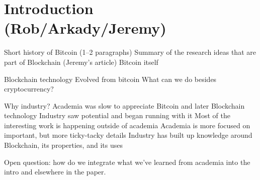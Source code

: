 
\section{Introduction (Rob/Arkady/Jeremy)}
Short history of Bitcoin (1--2 paragraphs)
	Summary of the research ideas that are part of Blockchain (Jeremy's article)
	Bitcoin itself
	
Blockchain technology
	Evolved from bitcoin
	What can we do besides cryptocurrency?
	
Why industry?
	Academia was slow to appreciate Bitcoin and later Blockchain technology
	Industry saw potential and began running with it
	Most of the interesting work is happening outside of academia
		Academia is more focused on important, but more ticky-tacky details
		Industry has built up knowledge around Blockchain, its properties, and its uses

Open question: how do we integrate what we've learned from academia into the intro and elsewhere in the paper.